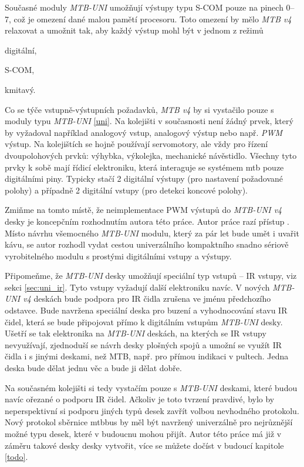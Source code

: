 Současné moduly \textit{MTB-UNI} umožňují výstupy typu S-COM pouze na pinech
0–7, což je omezení dané malou pamětí procesoru. Toto omezení by mělo
\textit{MTB v4} relaxovat a umožnit tak, aby každý výstup mohl být v jednom
z režimů

\begin{compactenum}
\item digitální,
\item S-COM,
\item kmitavý.
\end{compactenum}

Co se týče vstupně-výstupních požadavků, \textit{MTB v4} by si vystačilo pouze
s moduly typu \textit{MTB-UNI} \ref{uni}. Na kolejišti v současnosti není žádný
prvek, který by vyžadoval například analogový vstup, analogový výstup nebo např.
\textit{PWM} výstup. Na kolejištích se hojně používají servomotory, ale vždy
pro řízení dvoupolohových prvků: výhybka, výkolejka, mechanické návěstidlo.
Všechny tyto prvky k sobě mají řídicí elektroniku, která interaguje se systémem
\gls{mtb} pouze digitálními piny. Typicky stačí 2 digitální výstupy (pro
nastavení požadované polohy) a případně 2 digitální vstupy (pro detekci koncové
polohy).

Zmiňme na tomto místě, že neimplementace PWM výstupů do \textit{MTB-UNI v4}
desky je koncepčním rozhodnutím autora této práce. Autor práce razí přístup
. Místo návrhu všemocného
\textit{MTB-UNI} modulu, který za pár let bude umět i uvařit kávu, se autor
rozhodl vydat cestou univerzálního kompaktního snadno sériově vyrobitelného
modulu s prostými digitálními vstupy a výstupy.

Připomeňme, že \textit{MTB-UNI} desky umožňují speciální typ vstupů – IR vstupy,
viz sekci \ref{sec:uni_ir}. Tyto vstupy vyžadují další elektroniku navíc.
V nových \textit{MTB-UNI v4} deskách bude podpora pro IR čidla zrušena ve jménu
předchozího odstavce. Bude navržena speciální deska pro buzení a vyhodnocování
stavu IR čidel, která se bude připojovat přímo k digitálním vstupům
\textit{MTB-UNI} desky. Ušetří se tak elektronika na \textit{MTB-UNI} deskách,
na kterých se IR vstupy nevyužívají, zjednoduší se návrh desky plošných spojů
a umožní se využít IR čidla i s jinými deskami, než MTB, např. pro přímou
indikaci v pultech. Jedna deska bude dělat jednu věc a bude ji dělat dobře.

Na současném kolejišti si tedy vystačím pouze s \textit{MTB-UNI} deskami, které
budou navíc ořezané o podporu IR čidel. Ačkoliv je toto tvrzení pravdivé, bylo
by neperspektivní si podporu jiných typů desek zavřít volbou nevhodného
protokolu. Nový protokol sběrnice \gls{mtbbus} by měl být navržený univerzálně
pro nejrůznější možné typu desek, které v budoucnu mohou přijít. Autor této
práce má již v záměru takové desky desky vytvořit, více se můžete dočíst
v budoucí kapitole \ref{todo}.

